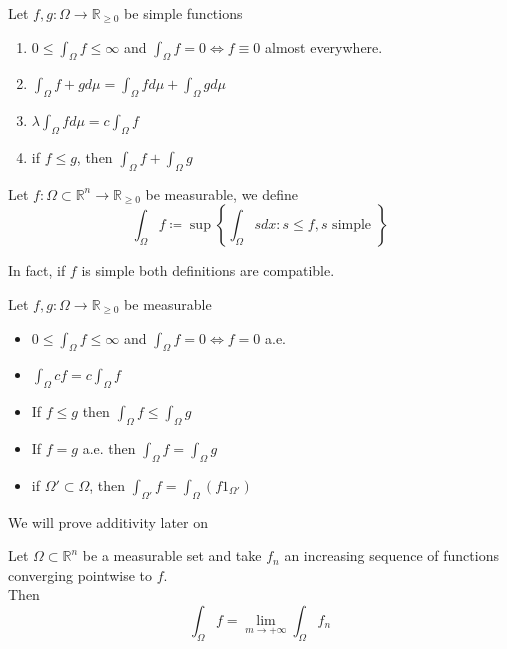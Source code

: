 \documentclass[../main.tex]{subfiles}
\begin{document}
\begin{propo}
Let $f,g : \Omega\to \mathbb{R}_{ \geq 0} $ be simple functions
\begin{enumerate}
\item $0 \leq  \int_\Omega f  \leq  \infty $ and $ \int_{ \Omega }^{  }f = 0 \iff f\equiv 0$ almost everywhere.
\item $ \int_{ \Omega }^{  } f+g d\mu = \int_{ \Omega }^{  }f d\mu + \int_{ \Omega }^{  }g d\mu$ 
\item $ \lambda\int_{ \Omega }^{  } f d\mu =c \int_{ \Omega }^{  } f$ 
\item if $f \leq g$, then $\int_{ \Omega }^{  }f + \int_{ \Omega }^{  }g$ 
\end{enumerate}

\end{propo}
\begin{defn}
Let $f: \Omega \subset \mathbb{R}^n\to \mathbb{R}_{ \geq 0} $ be measurable, we define 
\[ 
\int_{\Omega} f \coloneqq \sup \left\{ \int_{ \Omega }^{  }s dx: s \leq f, s \text{ simple }  \right\} 
\]

\end{defn}
\begin{rmq}
In fact, if $f$ is simple both definitions are compatible.
\end{rmq}
\begin{propo}
Let $f,g : \Omega \to \mathbb{R}_{ \geq 0} $ be measurable
\begin{itemize}
\item $ 0 \leq \int_{ \Omega }^{  }f \leq \infty $ and $ \int_{ \Omega }^{  }f = 0 \iff f=0$ a.e.
\item $ \int_{ \Omega }^{  } cf = c \int_{ \Omega }^{  }f$ 
\item If $f \leq g$ then $ \int_{ \Omega }^{  } f \leq \int_{ \Omega }^{  } g$ 
\item If $f=g$ a.e. then $ \int_{ \Omega }^{  }f = \int_{ \Omega }^{  }g$ 
\item if $\Omega' \subset \Omega$, then $ \int_{ \Omega' }^{  }f = \int_{ \Omega }^{  }( f 1_{\Omega'} ) $ 
\end{itemize}
We will prove additivity later on
\end{propo}
\begin{thm}
	Let $\Omega \subset \mathbb{R}^n$ be a measurable set and take $f_n$ an increasing sequence of functions converging pointwise to $f$.\\
Then
\[ 
\int_{ \Omega }^{  } f = \lim_{m \to  + \infty}  \int_{ \Omega }^{  }f_n
\]

\end{thm}
\end{document}
